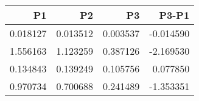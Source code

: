 \begin{tabular}{rrrr}
\toprule
P1 & P2 & P3 & P3-P1 \\
\midrule
0.018127 & 0.013512 & 0.003537 & -0.014590 \\
1.556163 & 1.123259 & 0.387126 & -2.169530 \\
0.134843 & 0.139249 & 0.105756 & 0.077850 \\
0.970734 & 0.700688 & 0.241489 & -1.353351 \\
\bottomrule
\end{tabular}
